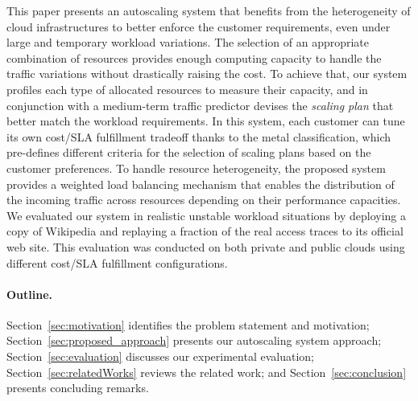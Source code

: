 This paper presents an autoscaling system that benefits from the
heterogeneity of cloud infrastructures to better enforce the customer
requirements, even under large and temporary workload variations. The
selection of an appropriate combination of resources provides enough
computing capacity to handle the traffic variations without
drastically raising the cost. To achieve that, our system profiles
each type of allocated resources to measure their capacity, and in
conjunction with a medium-term traffic predictor devises
the \emph{scaling plan} that better match the workload
requirements. In this system, each customer can tune its own cost/SLA
fulfillment tradeoff thanks to the metal classification, which
pre-defines different criteria for the selection of scaling plans
based on the customer preferences. To handle resource heterogeneity,
the proposed system provides a weighted load balancing mechanism that
enables the distribution of the incoming traffic across resources depending
on their performance capacities. We evaluated our system in realistic
unstable workload situations by deploying a copy of Wikipedia and
replaying a fraction of the real access traces to its official web
site. This evaluation was conducted on both private and public clouds
using different cost/SLA fulfillment configurations.


\paragraph{Outline.} 

Section~\ref{sec:motivation} identifies the problem statement and
motivation; Section~\ref{sec:proposed_approach} presents our
autoscaling system approach; Section~\ref{sec:evaluation} discusses
our experimental evaluation; Section~\ref{sec:relatedWorks} reviews
the related work; and Section~\ref{sec:conclusion} presents concluding
remarks.
